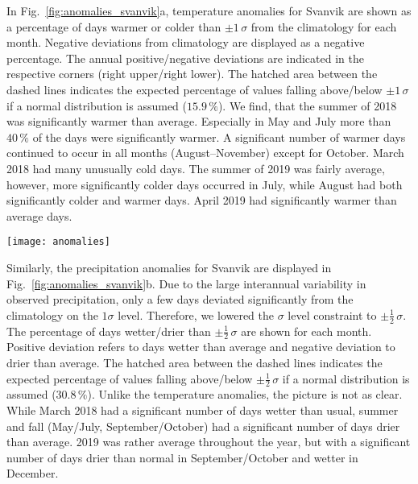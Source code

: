 \documentclass[bg, manuscript]{copernicus}
\begin{document}
In Fig.~\ref{fig:anomalies_svanvik}a, temperature anomalies for Svanvik are shown as a percentage of days warmer or colder than $\pm 1\,\sigma$ from the climatology for each month. Negative deviations from climatology are displayed as a negative percentage. The annual positive/negative deviations are indicated in the respective corners (right upper/right lower). The hatched area between the dashed lines indicates the expected percentage of values falling above/below $\pm 1\,\sigma$ if a normal distribution is assumed ($15.9\,\unit{\%}$). We find, that the summer of 2018 was significantly warmer than average. Especially in May and July more than $40\,\unit{\%}$ of the days were significantly warmer. A significant number of warmer days continued to occur in all months (August--November) except for October. March 2018 had many unusually cold days. The summer of 2019 was fairly average, however, more significantly colder days occurred in July, while August had both significantly colder and warmer days. April 2019 had significantly warmer than average days.

\begin{figure*}[t]
  
  \centering
  \texttt{[image: anomalies]}
  \caption{2018/19 anomalies of key environmental variables at Svanhovd displayed as difference from median for each month. The hatched area between indicates the IQR. (a) Temperature; (b) precipitation; (c) radiant energy; (d) ozone VMR.}
  \label{fig:anomalies_svanvik}
\end{figure*}

Similarly, the precipitation anomalies for Svanvik are displayed in Fig.~\ref{fig:anomalies_svanvik}b. Due to the large interannual variability in observed precipitation, only a few days deviated significantly from the climatology on the $1 \sigma$ level. Therefore, we lowered the $\sigma$ level constraint to $\pm \frac{1}{2}\,\sigma$. The percentage of days wetter/drier than $\pm \frac{1}{2}\,\sigma$ are shown for each month. Positive deviation refers to days wetter than average and negative deviation to drier than average. The hatched area between the dashed lines indicates the expected percentage of values falling above/below $\pm\frac{1}{2}\,\sigma$ if a normal distribution is assumed ($30.8\,\unit{\%}$). Unlike the temperature anomalies, the picture is not as clear. While March 2018 had a significant number of days wetter than usual, summer and fall (May/July, September/October) had a significant number of days drier than average. 2019 was rather average throughout the year, but with a significant number of days drier than normal in September/October and wetter in December.
\end{document}
